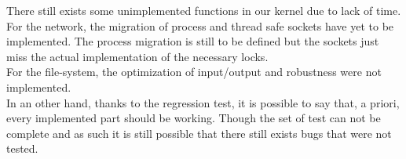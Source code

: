 There still exists some unimplemented functions in our kernel due to lack of
time.\\ 
For the network, the migration of process and thread safe sockets have
yet to be implemented. The process migration is still to be defined but the
sockets just miss the actual implementation of the necessary locks.\\
For the file-system, the optimization of input/output and robustness were not
implemented.\\
In an other hand, thanks to the regression test, it is possible to say that, a
priori, every implemented part should be working. Though the set of test can
not be complete and as such it is still possible that there still exists bugs
that were not tested.\\
